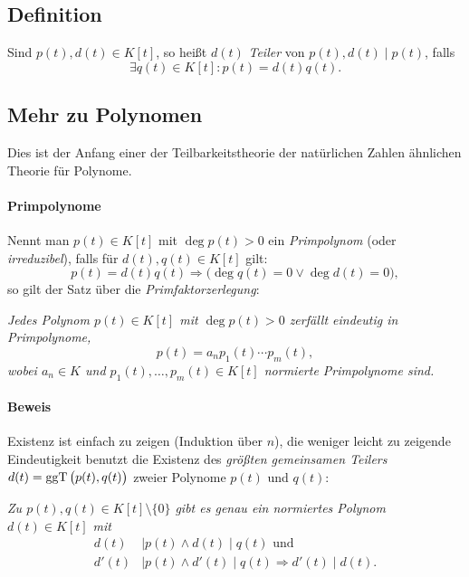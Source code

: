 \subsection{Definition}
	\begin{Definition}[Teiler]
		Sind $ p(t),d(t)\in K[t] $, so heißt $ d(t) $ \emph{Teiler} von $ p(t), d(t)\mid p(t) $, falls
			\[ \exists q(t)\in K[t]: p(t)= d(t)q(t). \]
	\end{Definition}

\subsection{Mehr zu Polynomen}
	Dies ist der Anfang einer der Teilbarkeitstheorie der natürlichen Zahlen ähnlichen Theorie für Polynome.
	
\paragraph{Primpolynome}
\begin{Definition}[Primpolynom]
	Nennt man $ p(t)\in K[t] $ mit $ \deg p(t) > 0$ ein \emph{Primpolynom} (oder \emph{irreduzibel}), falls für $ d(t),q(t)\in K[t] $ gilt:
		\[ p(t)= d(t)q(t) \Rightarrow \Big( \deg q(t)=0 \lor \deg d(t) = 0 \Big), \]
	so gilt der Satz über die \emph{Primfaktorzerlegung}:
\end{Definition}
	\begin{Satz}[Primfaktorzerlegung]
	\begin{addmargin}{1cm}
		\textit{Jedes Polynom $ p(t)\in K[t] $ mit $ \deg p(t)>0 $ zerfällt eindeutig in Primpolynome,
			\[ p(t) = a_n p_1(t) \cdots p_m(t), \]
		wobei $ a_n\in K $ und $ p_1(t),\dots,p_m(t)\in K[t] $ normierte Primpolynome sind.}
	\end{addmargin}
	\end{Satz}
	
\paragraph{Beweis}	
	Existenz ist einfach zu zeigen (Induktion über $ n $), die weniger leicht zu zeigende Eindeutigkeit benutzt die Existenz des \emph{größten gemeinsamen Teilers} $ d(t) = \operatorname{ggT}\big(p(t),q(t)\big) $ zweier Polynome $ p(t) $ und $ q(t) $:

	\begin{addmargin}{1cm}
		\textit{Zu $ p(t),q(t) \in K[t]\setminus \{0\} $ gibt es genau ein normiertes Polynom $ d(t)\in K[t] $ mit
			\begin{align*}
				d(t)&\mid p(t)\land d(t)\mid q(t) \text{ und}\\
				d'(t)&\mid p(t)\land d'(t)\mid q(t) \Rightarrow d'(t)\mid d(t).
			\end{align*}}
	\end{addmargin}
